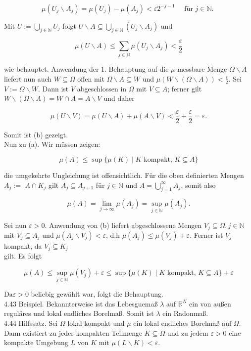 \documentclass[10pt, letterpaper]{article}
\begin{document}
$$
\mu\left(U_{j} \backslash A_{j}\right)=\mu\left(U_{j}\right)-\mu\left(A_{j}\right)<\varepsilon 2^{-j-1} \quad \text { für } j \in \mathbb{N} \text {. }
$$

Mit $U:=\bigcup_{j \in \mathbb{N}} U_{j}$ folgt $U \backslash A \subseteq \bigcup_{j \in \mathbb{N}}\left(U_{j} \backslash A_{j}\right)$ und

$$
\mu(U \backslash A) \leq \sum_{j \in \mathbb{N}} \mu\left(U_{j} \backslash A_{j}\right)<\frac{\varepsilon}{2}
$$

wie behauptet. Anwendung der 1. Behauptung auf die $\mu$-messbare Menge $\Omega \backslash A$ liefert nun auch $W \subseteq \Omega$ offen mit $\Omega \backslash A \subseteq W$ und $\mu(W \backslash(\Omega \backslash A))<\frac{\varepsilon}{2}$. Sei $V:=\Omega \backslash W$. Dann ist $V$ abgeschlossen in $\Omega$ mit $V \subseteq A$; ferner gilt $W \backslash(\Omega \backslash A)=W \cap A=A \backslash V$ und daher

$$
\mu(U \backslash V)=\mu(U \backslash A)+\mu(A \backslash V)<\frac{\varepsilon}{2}+\frac{\varepsilon}{2}=\varepsilon .
$$

Somit ist (b) gezeigt.\\
Nun zu (a). Wir müssen zeigen:

$$
\mu(A) \leq \sup \{\mu(K) \mid K \text { kompakt, } K \subseteq A\}
$$

die umgekehrte Ungleichung ist offensichtlich. Für die oben definierten Mengen $A_{j}:=$ $A \cap K_{j}$ gilt $A_{j} \subseteq A_{j+1}$ für $j \in \mathbb{N}$ und $A=\bigcup_{j=1}^{\infty} A_{j}$, somit also

$$
\mu(A)=\lim _{j \rightarrow \infty} \mu\left(A_{j}\right)=\sup _{j \in \mathbb{N}} \mu\left(A_{j}\right) .
$$

Sei nun $\varepsilon>0$. Anwendung von (b) liefert abgeschlossene Mengen $V_{j} \subseteq \Omega, j \in \mathbb{N}$ mit $V_{j} \subseteq A_{j}$ und $\mu\left(A_{j} \backslash V_{j}\right)<\varepsilon$, d.h $\mu\left(A_{j}\right) \leq \mu\left(V_{j}\right)+\varepsilon$. Ferner ist $V_{j}$ kompakt, da $V_{j} \subseteq K_{j}$\\
gilt. Es folgt

$$
\mu(A) \leq \sup _{j \in \mathbb{N}} \mu\left(V_{j}\right)+\varepsilon \leq \sup \{\mu(K) \mid K \text { kompakt, } K \subseteq A\}+\varepsilon
$$

$\mathrm{Da} \varepsilon>0$ beliebig gewählt war, folgt die Behauptung.\\
4.43 Beispiel. Bekannterweise ist das Lebesguemaß $\lambda$ auf $\mathbb{R}^{N}$ ein von außen reguläres und lokal endliches Borelmaß. Somit ist $\lambda$ ein Radonmaß.\\
4.44 Hilfssatz. Sei $\Omega$ lokal kompakt und $\mu$ ein lokal endliches Borelmaß auf $\Omega$. Dann existiert zu jeder kompakten Teilmenge $K \subseteq \Omega$ und zu jedem $\varepsilon>0$ eine kompakte Umgebung $L$ von $K$ mit $\mu(L \backslash K)<\varepsilon$.
\end{document}

